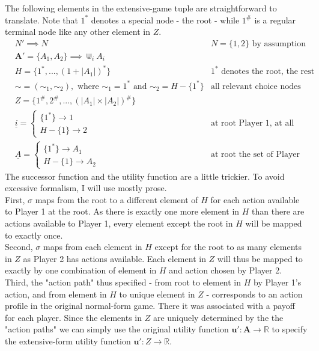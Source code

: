 \documentclass[10pt,a4paper]{article}
\begin{document}
\noindent The following elements in the extensive-game tuple are straightforward to translate. Note that $1^*$ denotes a special node - the root - while $1^{\#}$ is a regular terminal node like any other element in $Z$.
 \begin{align*}
&N' \implies N & N=\{1,2\} \text{ by assumption}\\
&\boldsymbol{A}'=\{A_1,A_2\} \implies \Cup_i A_i &\text{} \\
&H=\{1^*,...,(1+|A_1|)^*\} &\text{$1^*$ denotes the root, the rest are choice nodes for Player 2} \\
&\sim=(\sim_1,\sim_2), \text{ where $\sim_1=1^*$ and $\sim_2=H-\{1^*\}$} &\text{all relevant choice nodes are indistinguishable for Player 2}\\
&Z=\{1^{\#},2^{\#},...,(|A_1| \times |A_2|)^\# \}\\
&\underline{i}= \begin{cases}
\{1^*\} \rightarrow 1 \\
H-\{1\} \rightarrow 2 \end{cases} & \text{at root Player 1, at all other choice nodes Player 2}\\
&\underline{A}= \begin{cases}
\{1^*\}\rightarrow A_1  \\
H-\{1\} \rightarrow A_2 \end{cases} & \text{at root the set of Player 1's actions, at all other choice nodes Player 2's}
\end{align*}
The successor function and the utility function are a little trickier. To avoid excessive formalism, I will use mostly prose.\\
First, $\sigma$ maps from the root to a different element of $H$ for each action available to Player 1 at the root. As there is exactly one more element in $H$ than there are actions available to Player 1, every element except the root in $H$ will be mapped to exactly once.\\
Second, $\sigma$ maps from each element in $H$ except for the root to as many elements in $Z$ as Player 2 has actions available. Each element in $Z$ will thus be mapped to exactly by one combination of element in $H$ and action chosen by Player 2.\\
Third, the "action path" thus specified - from root to element in $H$ by Player 1's action, and from element in $H$ to unique element in $Z$ - corresponds to an action profile in the original normal-form game. There it was associated with a payoff for each player. Since the elements in $Z$ are uniquely determined by the the "action paths" we can simply use the original utility function $\boldsymbol{u}':\boldsymbol{A}\rightarrow \mathbb{R}$ to specify the extensive-form utility function $\boldsymbol{u}':Z\rightarrow \mathbb{R}$.\\
\end{document}
